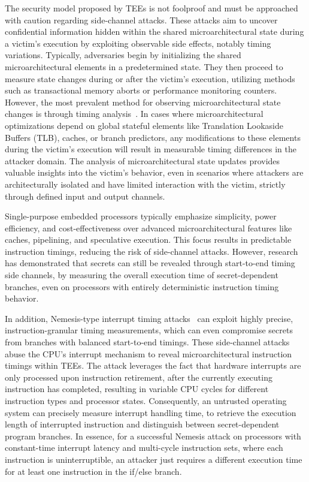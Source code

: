 The security model proposed by \acp{TEE} is not foolproof and must be
approached with caution regarding side-channel attacks. These attacks aim
to uncover confidential information hidden within the shared
microarchitectural state during a victim's execution by exploiting
observable side effects, notably timing variations. Typically, adversaries
begin by initializing the shared microarchitectural elements in a
predetermined state. They then proceed to measure state changes during or
after the victim's execution, utilizing methods such as transactional
memory aborts or performance monitoring counters. However, the most
prevalent method for observing microarchitectural state changes is through
timing analysis~\cite{vanbulckphdthesis}. In cases where microarchitectural
optimizations depend on global stateful elements like Translation Lookaside
Buffers (TLB), caches, or branch predictors, any modifications to these
elements during the victim's execution will result in measurable timing
differences in the attacker domain. The analysis of microarchitectural
state updates provides valuable insights into the victim's behavior, even
in scenarios where attackers are architecturally isolated and have limited
interaction with the victim, strictly through defined input and output
channels.

Single-purpose embedded processors typically emphasize simplicity, power
efficiency, and cost-effectiveness over advanced microarchitectural
features like caches, pipelining, and speculative execution. This focus
results in predictable instruction timings, reducing the risk of
side-channel attacks. However, research~\cite{Travis, brumley2005remote}
has demonstrated that secrets can still be revealed through start-to-end
timing side channels, by measuring the overall execution time of
secret-dependent branches, even on processors with entirely deterministic
instruction timing behavior. 

In addition, Nemesis-type interrupt timing attacks~\cite{Nemesis} can
exploit highly precise, instruction-granular timing measurements, which
can even compromise secrets from branches with balanced start-to-end
timings. These side-channel attacks abuse the CPU's interrupt mechanism to
reveal microarchitectural instruction timings within \acp{TEE}. The attack
leverages the fact that hardware interrupts are only processed upon
instruction retirement, after the currently executing instruction has
completed, resulting in variable CPU cycles for different instruction types
and processor states. Consequently, an untrusted operating system can
precisely measure interrupt handling time, to retrieve the execution length
of interrupted instruction and distinguish between secret-dependent program
branches. In essence, for a successful Nemesis attack on processors with
constant-time interrupt latency and multi-cycle instruction sets, where
each instruction is uninterruptible, an attacker just requires a different
execution time for at least one instruction in the if/else branch.

